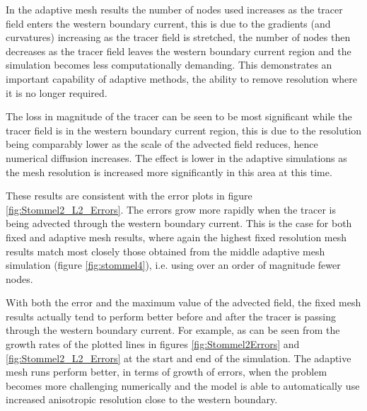 In the adaptive mesh results the number of nodes used increases as the tracer field
enters the western boundary current, this is due to the gradients (and curvatures)
increasing as the tracer field is stretched, the number of nodes then decreases as
the tracer field leaves the western boundary current region and the simulation becomes
less computationally demanding. This demonstrates an important capability of adaptive methods,
the ability to remove resolution where it is no longer required.

The loss in magnitude of the tracer can be seen to be most significant while the
tracer field is in the western boundary current region, this is due to the resolution
being comparably lower as the scale of the advected field reduces, hence numerical
diffusion increases. The effect is lower in the adaptive simulations as the mesh resolution is increased
more significantly in this area at this time.

These results are consistent with the error plots in figure \ref{fig:Stommel2_L2_Errors}.
The errors grow more rapidly when the tracer is being advected through the western boundary current.
This is the case for both fixed and adaptive mesh results, where again the highest fixed resolution
mesh results match most closely those obtained from the middle adaptive mesh simulation (figure \ref{fig:stommel4}),
i.e. using over an order of magnitude fewer nodes.

With both the \Ltwo error and the maximum value of the advected field, the fixed mesh results
actually tend to perform better before and after the tracer is passing through the western boundary current.
For example, as can be seen from the growth rates of the plotted lines in figures \ref{fig:Stommel2Errors} and \ref{fig:Stommel2_L2_Errors}
 at the start and end of the simulation. The adaptive mesh runs perform better, in terms of
growth of errors, when the problem becomes more challenging numerically and the model is able to automatically use
increased anisotropic resolution close to the western boundary.


